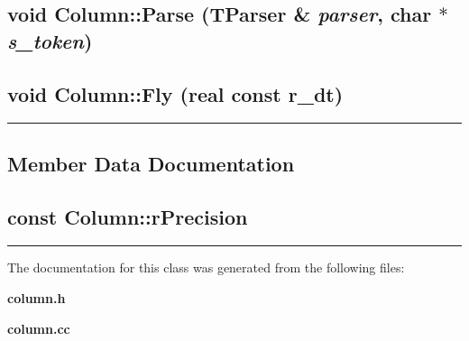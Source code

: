 \label{Column_d7}
\subsection{\setlength{\rightskip}{0pt plus 5cm}void Column::Parse ({\bf TParser} \& {\em parser}, char $\ast$ {\em s\_\-token})\hspace{0.3cm}{\tt  [static]}}

\label{Column_d8}
\subsection{\setlength{\rightskip}{0pt plus 5cm}void Column::Fly ({\bf real} const r\_\-dt)\hspace{0.3cm}{\tt  [static]}}

\vspace{0.4cm}\hrule\vspace{0.2cm}
\subsection*{Member Data Documentation}
\label{Column_d9}
\subsection{ const Column::r\-Precision\hspace{0.3cm}{\tt  [static]}}

\vspace{0.4cm}\hrule\vspace{0.2cm}
The documentation for this class was generated from the following files:\begin{CompactItemize}
\item 
{\bf column.h}\item 
{\bf column.cc}\end{CompactItemize}
